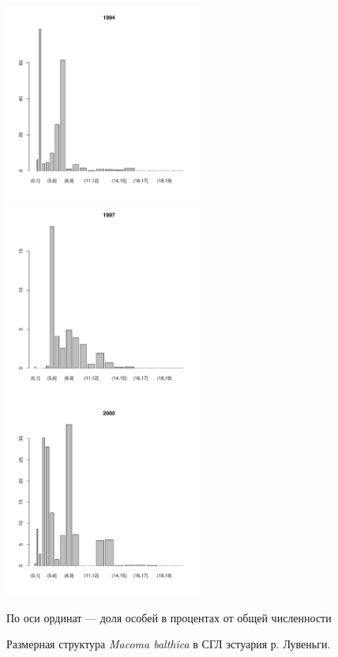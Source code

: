 \documentclass[12pt, a4paper]{article}
\begin{document}
\begin{figure}[h]
\begin{multicols}{3}
\hfill
\includegraphics[width=65mm]{../White_Sea/Estuatiy_Luvenga/sizestr_percents_1994_.pdf}
\hfill
\includegraphics[width=65mm]{../White_Sea/Estuatiy_Luvenga/sizestr_percents_1997_.pdf}
\hfill
\includegraphics[width=65mm]{../White_Sea/Estuatiy_Luvenga/sizestr_percents_2000_.pdf}
\end{multicols}



\caption{Размерная структура {\it Macoma balthica} в СГЛ эстуария р. Лувеньги.}
\label{ris:size_str_estuary_Luv}

По оси ординат --- доля особей в процентах от общей численности
\end{figure}
\end{document}
